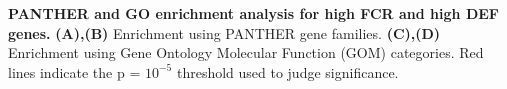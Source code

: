 \textbf{PANTHER and GO enrichment analysis for high FCR and high DEF genes.}
\textbf{(A),(B)} Enrichment using PANTHER gene families. \textbf{(C),(D)} Enrichment using Gene Ontology Molecular Function (GOM) categories. Red lines indicate the p = $10^{-5}$ threshold used to judge significance.